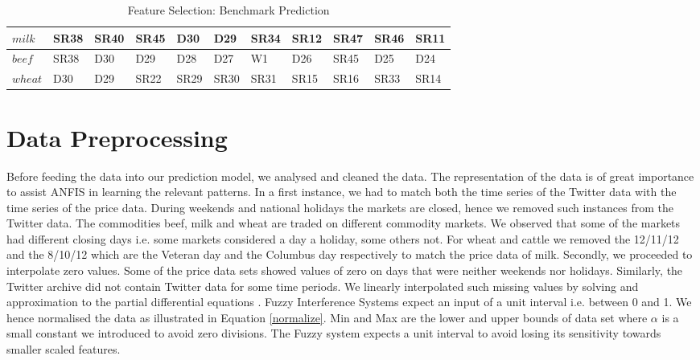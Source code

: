 \begin{table}[H]
\centering
\begin{tabular}{ |p{2cm}|p{1cm}|p{1cm}|p{1cm}|p{1cm}|p{1cm}|p{1cm}|p{1cm}|p{1cm}|p{1cm}| p{1cm}|  }
\hline
$milk$ & SR38 & SR40 & SR45 & D30 & D29 &  SR34 & SR12 & SR47 & SR46 & SR11 \\
\hline
$beef$ & SR38 & D30 & D29 & D28 & D27 &  W1 & D26 & SR45 & D25 & D24 \\
\hline
$wheat$ & D30 & D29 & SR22 & SR29 & SR30 & SR31 & SR15 & SR16 & SR33 & SR14 \\
\hline
\end{tabular}
\caption{Feature Selection: Benchmark Prediction}
\label{tab:feat_mod3}
\end{table}





\section{Data Preprocessing}
\label{dataprocessing}

Before feeding the data into our prediction model, we analysed and cleaned the data. The representation of the data is of great importance to assist ANFIS in learning the relevant patterns. In a first instance, we had to match both the time series of the Twitter data with the time series of the price data. During weekends and national holidays the markets are closed, hence we  removed such instances from the Twitter data. The commodities beef, milk and wheat are traded on different commodity markets. We observed that some of the markets had different closing days i.e. some markets considered a day a holiday, some others not. For wheat and cattle we removed the 12/11/12 and the 8/10/12 which are the Veteran day and the Columbus day respectively to match the price data of milk. Secondly, we proceeded to interpolate zero values. Some of the price data sets showed values of zero on days that were neither weekends nor holidays. Similarly, the Twitter archive did not contain Twitter data for some time periods. We linearly interpolated such missing values by solving and approximation to the partial differential equations \cite{john2012}. Fuzzy Interference Systems expect an input of a unit interval i.e. between 0 and 1. We hence normalised the data as illustrated in Equation \ref{normalize}. Min and Max are the lower and upper bounds of data set where $\alpha$ is a small constant we introduced to avoid zero divisions. The Fuzzy system expects a unit interval to avoid losing its sensitivity towards smaller scaled features. 


